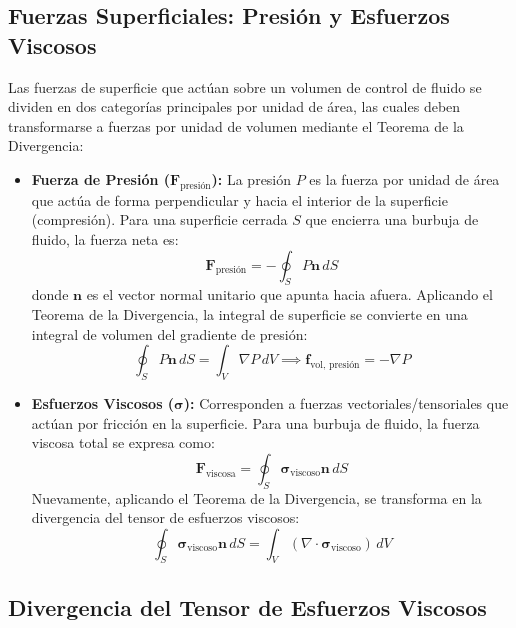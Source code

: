 \documentclass[11pt,letterpaper]{article}
\begin{document}
\subsection{Fuerzas Superficiales: Presión y Esfuerzos Viscosos}

Las fuerzas de superficie que actúan sobre un volumen de control de fluido se dividen en dos categorías principales por unidad de área, las cuales deben transformarse a fuerzas por unidad de volumen mediante el Teorema de la Divergencia:

\begin{itemize}
    \item \textbf{Fuerza de Presión ($\mathbf{F}_{\text{presión}}$):} La presión $P$ es la fuerza por unidad de área que actúa de forma perpendicular y hacia el interior de la superficie (compresión). Para una superficie cerrada $S$ que encierra una burbuja de fluido, la fuerza neta es:
    \begin{equation}
        \mathbf{F}_{\text{presión}} = -\oint_S P \mathbf{n} \, dS
    \end{equation}
    donde $\mathbf{n}$ es el vector normal unitario que apunta hacia afuera. Aplicando el Teorema de la Divergencia, la integral de superficie se convierte en una integral de volumen del gradiente de presión:
    \begin{equation}
        \oint_S P \mathbf{n} \, dS = \int_V \nabla P \, dV \implies \mathbf{f}_{\text{vol, presión}} = -\nabla P
    \end{equation}

    \item \textbf{Esfuerzos Viscosos ($\boldsymbol{\sigma}$):} Corresponden a fuerzas vectoriales/tensoriales que actúan por fricción en la superficie. Para una burbuja de fluido, la fuerza viscosa total se expresa como:
    \begin{equation}
        \mathbf{F}_{\text{viscosa}} = \oint_S \boldsymbol{\sigma}_{\text{viscoso}} \mathbf{n} \, dS
    \end{equation}
    Nuevamente, aplicando el Teorema de la Divergencia, se transforma en la divergencia del tensor de esfuerzos viscosos:
    \begin{equation}
        \oint_S \boldsymbol{\sigma}_{\text{viscoso}} \mathbf{n} \, dS = \int_V (\nabla \cdot \boldsymbol{\sigma}_{\text{viscoso}}) \, dV
    \end{equation}
\end{itemize}

\subsection{Divergencia del Tensor de Esfuerzos Viscosos}
\end{document}
